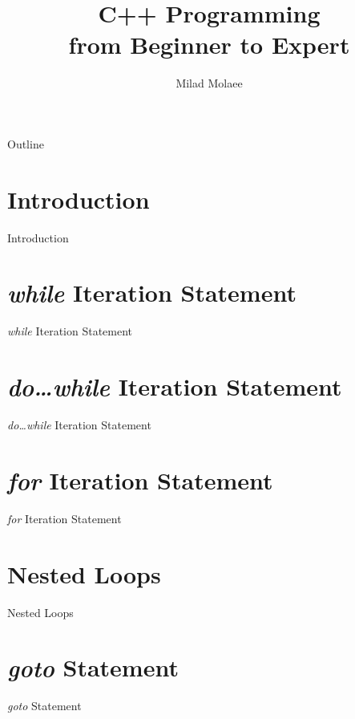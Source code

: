 \documentclass[10pt]{beamer}
\author[miladmolaee@hotmail.com]{\large Milad Molaee}
\title[C++ Programming]{C++ Programming\\\vspace{5pt}from Beginner to Expert\\\vspace{20pt}{\color{darkblue}\large Chapter 5 Control Statements: Part 2 \\ Loops and Logical Operators}}
\begin{document}
 
%
\frame{\titlepage}

%
\begin{frame}{Outline}
\tableofcontents
\end{frame}


\section{Introduction}
\begin{frame}{Introduction}
	\lipsum[2]
\end{frame}

\section{\textbf{\textit{\color{lblue}while}} Iteration Statement}
\begin{frame}{\textit{\color{blue}while} Iteration Statement}
	\lipsum[2]
\end{frame}

\section{\textbf{\textit{\color{lblue}do…while}} Iteration Statement}
\begin{frame}{\textit{\color{blue}do…while} Iteration Statement}
	\lipsum[2]
\end{frame}

\section{\textbf{\textit{\color{lblue}for}} Iteration Statement}
\begin{frame}{\textit{\color{blue}for} Iteration Statement}
	\lipsum[2]
\end{frame}

\section{Nested Loops}
\begin{frame}{Nested Loops}
	\lipsum[2]
\end{frame}


\section{\textbf{\textit{\color{lblue}goto}} Statement}
\begin{frame}{\textit{\color{blue}goto} Statement}
	\lipsum[2]
\end{frame}
\end{document}
